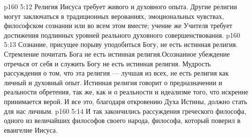 \vs p160 5:12 Религия Иисуса требует живого и духовного опыта. Другие религии могут заключаться в традиционных верованиях, эмоциональных чувствах, философском сознании или во всем этом вместе; учение же Учителя требует достижения подлинных уровней реального духовного совершенствования.
\vs p160 5:13 Сознание, присущее порыву уподобиться Богу, не есть истинная религия. Стремление почитать Бога не есть истинная религия.Осознанное убеждение отречься от себя и служить Богу не есть истинная религия. Мудрость рассуждения о том, что эта религия --- лучшая из всех, не есть религия как личный и духовный опыт. Истинная религия говорит о предназначении и реальности обретения, так же, как и о реальности и идеализме того, что искренне принимается верой. И все это, благодаря откровению Духа Истины, должно стать для нас личным.
\vs p160 5:14 \pc И так закончились рассуждения греческого философа, одного из величайших философов своего народа, философа, который поверил в евангелие Иисуса.

